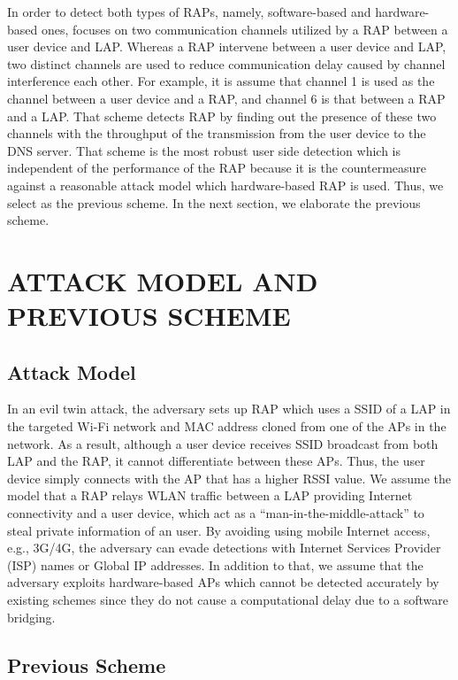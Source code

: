 \documentclass[conference]{IEEEtran}
\begin{document}
In order to detect both types of RAPs, namely, software-based and hardware-based ones, \cite{previous} focuses on two communication channels utilized by a RAP between a user device and LAP.
Whereas a RAP intervene between a user device and LAP, two distinct channels are used to reduce communication delay caused by channel interference each other.
For example, it is assume that channel 1 is used as the channel between a user device and a RAP, and channel 6 is that between a RAP and a LAP.
That scheme detects RAP by finding out the presence of these two channels with the throughput of the transmission from the user device to the DNS server.
That scheme is the most robust user side detection which is independent of the performance of the RAP because it is the countermeasure against a reasonable attack model which hardware-based RAP is used.
Thus, we select \cite{previous} as the previous scheme.
In the next section, we elaborate the previous scheme.

\section{ATTACK MODEL AND PREVIOUS SCHEME}
\subsection{Attack Model}
In an evil twin attack, the adversary sets up RAP which uses a SSID of a LAP in the targeted Wi-Fi network and MAC address cloned from one of the APs in the network.
As a result, although a user device receives SSID broadcast from both LAP and the RAP, it cannot differentiate between these APs.
Thus, the user device simply connects with the AP that has a higher RSSI value.
We assume the model that a RAP relays WLAN traffic between a LAP providing Internet connectivity and a user device, which act as a ``man-in-the-middle-attack'' to steal private information of an user.
By avoiding using mobile Internet access, e.g., 3G/4G, the adversary can evade detections with Internet Services Provider (ISP) names or Global IP addresses\cite{rtt}.
In addition to that, we assume that the adversary exploits hardware-based APs which cannot be detected accurately by existing schemes since they do not cause a computational delay due to a software bridging.

\subsection{Previous Scheme}
\end{document}
